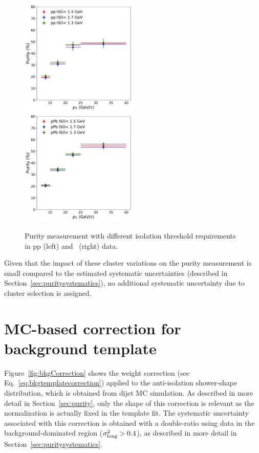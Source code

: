 \begin{figure}
	\center
	\includegraphics[width=0.495\textwidth]{Checks_Systematics/ppiso.pdf}
	\includegraphics[width=0.495\textwidth]{Checks_Systematics/ppbiso.pdf}
	\caption{Purity measurement with different isolation threshold requirements in pp (left) and \pPb~(right) data.}
	\label{fig:isolationvariation}
\end{figure}




Given that the impact of these cluster variations on the purity measurement is small compared to the estimated systematic uncertainties (described in Section~\ref{sec:puritysystematics}), no additional systematic uncertainty due to cluster selection is assigned. 

\section{MC-based correction for background template}
\label{sec:MCbasedcorrection}

Figure~\ref{fig:bkgCorrection} shows the weight correction (see Eq.~\ref{eq:bkgtemplatecorrection}) applied to the anti-isolation shower-shape distribution, which is obtained from dijet MC simulation. As described in more detail in Section~\ref{sec:purity}, only the shape of this correction is relevant as the normalization is actually fixed in the template fit. The systematic uncertainty associated with this correction is obtained with a double-ratio using data in the background-dominated region ($\sigma^{2}_{\mathrm{long}}>0.4$), as described in more detail in Section~\ref{sec:puritysystematics}. 

